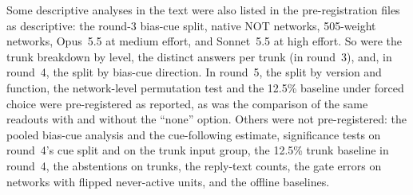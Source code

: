 \documentclass[10pt]{article}
\newcommand{\Sonnet}{Sonnet~5.5}
\newcommand{\Opus}{Opus~5.5}
\begin{document}
Some descriptive analyses in the text were also listed in the pre-registration files as descriptive: the round-3 bias-cue split, native NOT networks, 505-weight networks, \Opus{} at medium effort, and \Sonnet{} at high effort. So were the trunk breakdown by level, the distinct answers per trunk (in round~3), and, in round~4, the split by bias-cue direction. In round~5, the split by version and function, the network-level permutation test and the 12.5\% baseline under forced choice were pre-registered as reported, as was the comparison of the same readouts with and without the ``none'' option. Others were not pre-registered: the pooled bias-cue analysis and the cue-following estimate, significance tests on round~4's cue split and on the trunk input group, the 12.5\% trunk baseline in round~4, the abstentions on trunks, the reply-text counts, the gate errors on networks with flipped never-active units, and the offline baselines.
\end{document}
